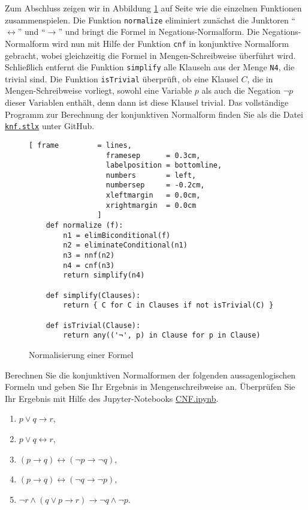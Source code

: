 Zum Abschluss zeigen wir in Abbildung \ref{fig:normalize} auf Seite \pageref{fig:normalize}
wie die einzelnen Funktionen zusammenspielen.  Die Funktion \texttt{normalize} eliminiert
zunächst die Junktoren ``$\leftrightarrow$'' und ``$\rightarrow$'' und bringt die Formel
in Negations-Normalform.  Die Negations-Normalform wird nun mit Hilfe der Funktion
\texttt{cnf} in konjunktive Normalform gebracht, wobei gleichzeitig die Formel in
Mengen-Schreibweise überführt wird.  Schließlich entfernt die Funktion \texttt{simplify}
alle Klauseln aus der Menge \texttt{N4}, die trivial sind.  Die Funktion \texttt{isTrivial}
überprüft, ob eine Klausel $C$, die in Mengen-Schreibweise vorliegt, sowohl eine Variable $p$
als auch die Negation $\neg p$ dieser Variablen enthält, denn dann ist diese Klausel trivial.  
Das vollständige Programm zur Berechnung der konjunktiven Normalform finden Sie als die Datei
\href{https://github.com/karlstroetmann/Logik/blob/master/SetlX/knf.stlx}{\texttt{knf.stlx}} 
unter GitHub.

\begin{figure}[!ht]
  \centering
\begin{Verbatim}[ frame         = lines, 
                  framesep      = 0.3cm, 
                  labelposition = bottomline,
                  numbers       = left,
                  numbersep     = -0.2cm,
                  xleftmargin   = 0.0cm,
                  xrightmargin  = 0.0cm
                ]
    def normalize (f):
        n1 = elimBiconditional(f)
        n2 = eliminateConditional(n1)
        n3 = nnf(n2)
        n4 = cnf(n3)
        return simplify(n4)
    
    def simplify(Clauses):
        return { C for C in Clauses if not isTrivial(C) }
    
    def isTrivial(Clause):
        return any(('¬', p) in Clause for p in Clause)
\end{Verbatim} 
\vspace*{-0.3cm}
  \caption{Normalisierung einer Formel}
  \label{fig:normalize}
\end{figure}

\exercise
Berechnen Sie die konjunktiven Normalformen der folgenden aussagenlogischen Formeln und geben Sie Ihr Ergebnis
in Mengenschreibweise an.  Überprüfen Sie Ihr Ergebnis mit Hilfe des Jupyter-Notebooks 
\href{https://github.com/karlstroetmann/Logik/blob/master/Python/CNF.ipynb}{CNF.ipynb}.
\begin{enumerate}
\item $p \vee q \rightarrow r$,
\item $p \vee q \leftrightarrow r$,
\item $(p \rightarrow q) \leftrightarrow (\neg p \rightarrow \neg q)$,
\item $(p \rightarrow q) \leftrightarrow (\neg q \rightarrow \neg p)$,
\item $\neg r \wedge (q \vee p \rightarrow r) \rightarrow \neg q \wedge \neg p$.
\end{enumerate}


